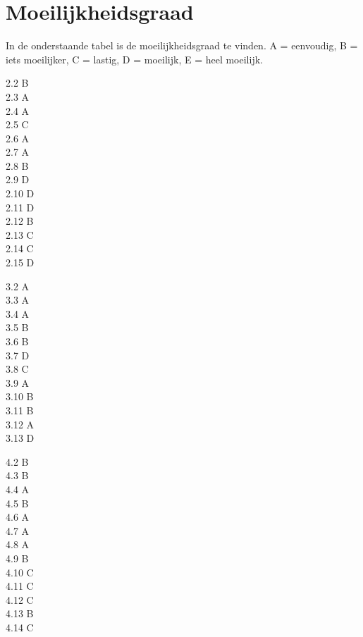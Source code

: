\documentclass[a4paper,10pt,fleqn,twoside]{article}
\begin{document}
\iffalse
\section{Moeilijkheidsgraad}
In de onderstaande tabel is de moeilijkheidsgraad te vinden. A = eenvoudig, B = iets moeilijker, C = lastig, D = moeilijk, E = heel moeilijk.
 
\begin{multicols}{4}
2.2 B\\
2.3 A\\
2.4 A\\
2.5 C\\
2.6 A\\
2.7 A\\
2.8 B\\
2.9 D\\
2.10 D\\
2.11 D\\
2.12 B\\
2.13 C\\
2.14 C\\
2.15 D
\end{multicols}

\begin{multicols}{4}
3.2 A\\
3.3 A\\
3.4 A\\
3.5 B\\
3.6 B\\
3.7 D\\
3.8 C\\
3.9 A\\
3.10 B\\
3.11 B\\
3.12 A\\
3.13 D
\end{multicols}

\begin{multicols}{4}
4.2 B\\
4.3 B\\
4.4 A\\
4.5 B\\
4.6 A\\
4.7 A\\
4.8 A\\
4.9 B\\
4.10 C\\
4.11 C\\
4.12 C\\
4.13 B\\
4.14 C
\end{multicols}
\end{document}
